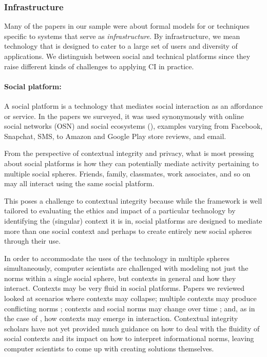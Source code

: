 \documentclass[../thesis.tex]{subfiles}
\begin{document}
\subsubsection{Infrastructure}
\label{CI4.1.2}
  
Many of the papers in our sample were about formal models for or
techniques specific to systems that serve as \textit{infrastructure}.
By infrastructure, we mean technology that is designed to cater to a
large set of users and diversity of applications. We distinguish
between social and technical platforms since they raise different kinds
of challenges to applying CI in practice.

\paragraph{Social platform:} A social platform is a technology that
mediates social interaction as an affordance or service. In the papers
we surveyed, it was used synonymously with online social networks (OSN)
and social ecosystems (\citet{kayes2013aegis}), examples varying
from Facebook, Snapchat, SMS, to Amazon and Google Play store reviews,
and email.

From the perspective of contextual integrity and privacy, what is most
pressing about social platforms is how they can potentially mediate
activity pertaining to multiple social spheres. Friends, family,
classmates, work associates, and so on may all interact using the same
social platform.

This poses a challenge to contextual integrity because while the
framework is well tailored to evaluating the ethics and impact of a
particular technology by identifying the (singular) context it is in,
social platforms are designed to mediate more than one social context
and perhaps to create entirely new social spheres through their use.

In order to accommodate the uses of the technology in multiple spheres
simultaneously, computer scientists are challenged with modeling not
just the norms within a single social sphere, but contexts in general
and how they interact. Contexts may be very fluid in social platforms.
Papers we reviewed looked at scenarios where contexts may collapse;
multiple contexts may produce conflicting norms \citep{tierney2014realizing}; contexts and social norms may change over time
\citep{netter2011assisted} \citep{sayaf2014mathrm};
and, as in the case of
\citet{criado2015implicit}, how contexts may emerge in interaction.
Contextual integrity scholars have not yet provided much guidance on
how to deal with the fluidity of social contexts and its impact on how
to interpret informational norms, leaving computer scientists to come
up with creating solutions themselves.
\end{document}
